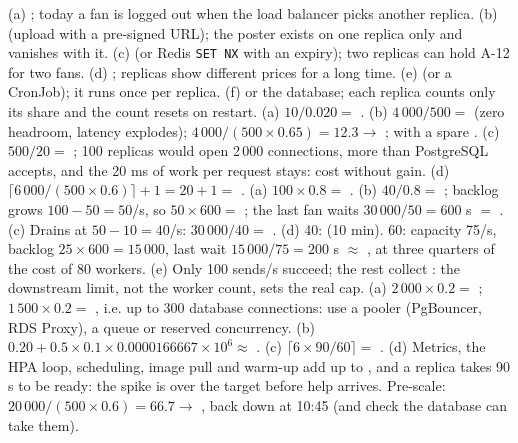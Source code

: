  (a) ; today a fan is logged out when the load balancer picks another replica. (b)  (upload with a pre-signed URL); the poster exists on one replica only and vanishes with it. (c)  (or Redis \texttt{SET NX} with an expiry); two replicas can hold A-12 for two fans. (d) ; replicas show different prices for a long time. (e)  (or a CronJob); it runs once per replica. (f)  or the database; each replica counts only its share and the count resets on restart.
 (a) $10 / 0.020 =$ . (b) $4\,000/500 =$  (zero headroom, latency explodes); $4\,000/(500 \times 0.65) = 12.3 \to$ ; with a spare . (c) $500/20 =$ ; 100 replicas would open 2\,000 connections, more than PostgreSQL accepts, and the 20 ms of work per request stays: cost without gain. (d) $\lceil 6\,000/(500 \times 0.6) \rceil + 1 = 20 + 1 =$ .
 (a) $100 \times 0.8 =$ . (b) $40/0.8 =$ ; backlog grows $100 - 50 = 50$/s, so $50 \times 600 =$ ; the last fan waits $30\,000/50 = 600$ s $=$ . (c) Drains at $50 - 10 = 40$/s: $30\,000/40 =$ . (d) 40:  (10 min). 60: capacity 75/s, backlog $25 \times 600 = 15\,000$, last wait $15\,000/75 = 200$ s $\approx$ , at three quarters of the cost of 80 workers. (e) Only 100 sends/s succeed; the rest collect : the downstream limit, not the worker count, sets the real cap.
 (a) $2\,000 \times 0.2 =$ ; $1\,500 \times 0.2 =$ , i.e. up to 300 database connections: use a pooler (PgBouncer, RDS Proxy), a queue or reserved concurrency. (b) $0.20 + 0.5 \times 0.1 \times 0.0000166667 \times 10^6 \approx$ . (c) $\lceil 6 \times 90/60 \rceil =$ . (d) Metrics, the HPA loop, scheduling, image pull and warm-up add up to , and a replica takes 90 s to be ready: the spike is over the target before help arrives. Pre-scale: $20\,000/(500 \times 0.6) = 66.7 \to$ , back down at 10:45 (and check the database can take them).
